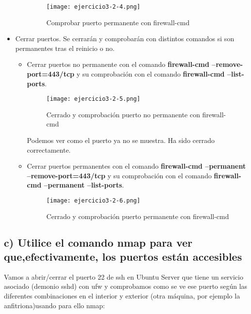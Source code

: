 \begin{itemize}
\begin{itemize}
			\begin{figure}[H] 
				\centering
				\texttt{[image: ejercicio3-2-4.png]} 
				\label{figura26} 
				
				\caption{Comprobar puerto permanente con firewall-cmd}
			\end{figure}
			
			
		\end{itemize}
		\item Cerrar puertos. Se cerrarán y comprobarán con distintos comandos si son permanentes tras el reinicio o no.
			\begin{itemize}
				\item Cerrar puertos no permanente con el comando \textbf{firewall-cmd --remove-port=443/tcp} y su comprobación con el comando \textbf{firewall-cmd --list-ports}.
				\begin{figure}[H] 
					\centering
					\texttt{[image: ejercicio3-2-5.png]} 
					\label{figura27} 
					
					\caption{Cerrado y comprobación puerto no permanente con firewall-cmd}
				\end{figure}
				
				Podemos ver como el puerto ya no se muestra. Ha sido cerrado correctamente.
				
				\item Cerrar puertos permanentes con el comando \textbf{firewall-cmd --permanent --remove-port=443/tcp} y su comprobación con el comando \textbf{firewall-cmd --permanent --list-ports}.
				\begin{figure}[H] 
					\centering
					\texttt{[image: ejercicio3-2-6.png]} 
					\label{figura28} 
					
					\caption{Cerrado y comprobación puerto permanente con firewall-cmd}
				\end{figure}
			\end{itemize}
	\end{itemize}
	
	\subsection{c) Utilice el comando nmap para ver que,efectivamente, los puertos están accesibles}

	Vamos a abrir/cerrar el puerto 22 de ssh en Ubuntu Server que tiene un servicio asociado (demonio sshd) con ufw y comprobamos como se ve ese puerto según las diferentes combinaciones en el interior y exterior (otra máquina, por ejemplo la anfitriona)usando para ello nmap\cite{ejercicio3-4}:
	
